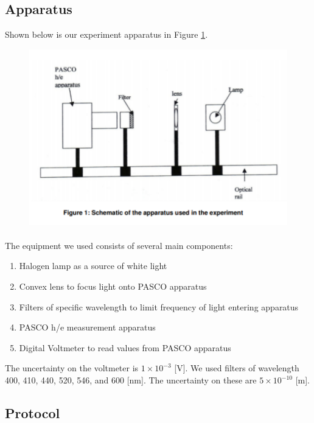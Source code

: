 \documentclass{article}
\begin{document}
\subsection{Apparatus}

Shown below is our experiment apparatus in Figure \ref{fig:apparatus}.

\begin{figure}
  \includegraphics{./img/apparatus.pdf}
  \caption{\autocite{UPCSE2018}}
  \label{fig:apparatus}
\end{figure}

\paragraph{}
The equipment we used consists of several main components:
\begin{enumerate}
  \item Halogen lamp as a source of white light
  \item Convex lens to focus light onto PASCO apparatus
  \item Filters of specific wavelength to limit frequency of light entering apparatus
  \item PASCO h/e measurement apparatus
  \item Digital Voltmeter to read values from PASCO apparatus
\end{enumerate}
The uncertainty on the voltmeter is $1 \times 10^{-3}$ [V]. We used filters of wavelength 400, 410, 440, 520, 546, and 600 [nm]. The uncertainty on these are $5 \times 10^{-10}$ [m].

\subsection{Protocol}
\end{document}
